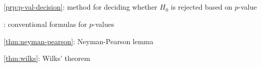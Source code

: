 \subsection*{}
\item \cref{prp:p-val-decision}: method for deciding whether \(H_0\) is rejected based on \(p\)-value
\item {}: conventional formulas for \(p\)-values
\item \cref{thm:neyman-pearson}: Neyman-Pearson lemma
\item \cref{thm:wilks}: Wilks' theorem
